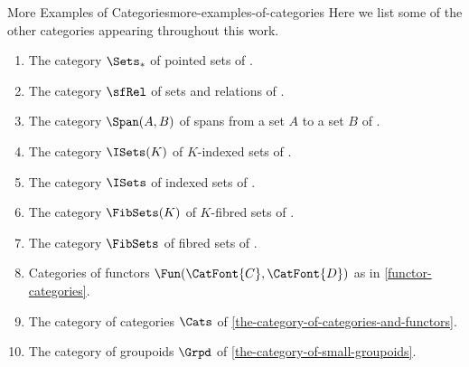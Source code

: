 \begin{example}{More Examples of Categories}{more-examples-of-categories}%
    Here we list some of the other categories appearing throughout this work.
    \begin{enumerate}
        \item\label{more-examples-of-categories-pointed-sets}The category $\Sets_{*}$ of pointed sets of .
        \item\label{more-examples-of-categories-relations}The category $\sfRel$ of sets and relations of .
        \item\label{more-examples-of-categories-spans}The category $\Span(A,B)$ of spans from a set $A$ to a set $B$ of .
        \item\label{more-examples-of-categories-indexed-sets-k}The category $\ISets(K)$ of $K$-indexed sets of .
        \item\label{more-examples-of-categories-indexed-sets}The category $\ISets$ of indexed sets of .
        \item\label{more-examples-of-categories-fibred-sets-k}The category $\FibSets(K)$ of $K$-fibred sets of .
        \item\label{more-examples-of-categories-fibred-sets}The category $\FibSets$ of fibred sets of .
        \item\label{more-examples-of-categories-functor-categories}Categories of functors $\Fun(\CatFont{C},\CatFont{D})$ as in \cref{functor-categories}.
        \item\label{more-examples-of-categories-categories}The category of categories $\Cats$ of \cref{the-category-of-categories-and-functors}.
        \item\label{more-examples-of-categories-groupoids}The category of groupoids $\Grpd$ of \cref{the-category-of-small-groupoids}.
    \end{enumerate}
\end{example}
